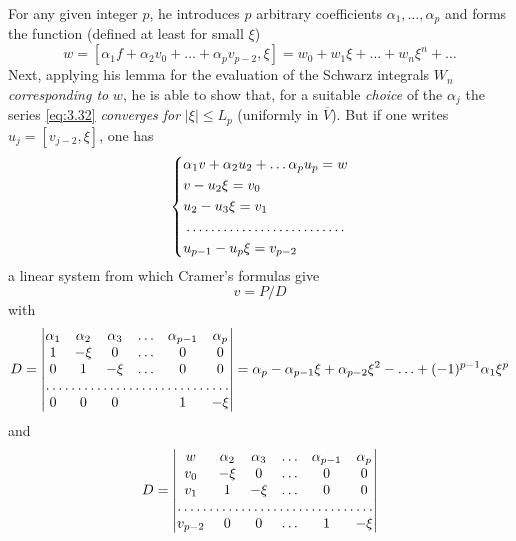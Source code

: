 \documentclass[12pt,a4paper,leqno,twoside]{extbook}
\begin{document}
For any given integer \(p\), he introduces \(p\) arbitrary coefficients \(\alpha_1, \ldots, \alpha_p\) and forms the function (defined at least for small \(\xi\))
\begin{equation}
    \label{eq:3.32}
    w = [\alpha_1 f + \alpha_2 v_0 + \ldots + \alpha_p v_{p-2}, \xi] = w_0 + w_1 \xi + \ldots + w_n \xi^n + \ldots
\end{equation}
Next, applying his lemma for the evaluation of the Schwarz integrals \(W_n\) \emph{corresponding to} \(w\), he is able to show that, for a suitable \emph{choice} of the \(\alpha_j\) the series \eqref{eq:3.32} \emph{converges for} \(|\xi| \leq L_p\) (uniformly in \(\overline{V}\)). But if one writes \(u_j = \left[v_{j-2}, \xi\right]\), one has
\begin{equation}
    \label{eq:3.33}
    \begin{dcases}
        \alpha_1 v + \alpha_2 u_2 + \ldots \alpha_p u_p = w \\
        v - u_2 \xi = v_0 \\
        u_2 - u_3 \xi = v_1 \\
        \dotfill \\
        u_{p-1} - u_p \xi = v_{p-2}
    \end{dcases}
\end{equation}
a linear system from which Cramer's formulas give
\begin{equation}
    \label{eq:3.34}
    v = P / D
\end{equation}
with
\[
    D =
    \left|
    \begin{matrix}
        \alpha_1 & \alpha_2 & \alpha_3 & \ldots & \alpha_{p-1} & \alpha_p \\
        1 & -\xi & 0 & \ldots & 0 & 0 \\
        0 & 1 & -\xi & \ldots & 0 & 0 \\
        \hdotsfor{6} \\
        0 & 0 & 0 & & 1 & -\xi
    \end{matrix}
    \right|
    = \alpha_p - \alpha_{p-1}\xi + \alpha_{p-2}\xi^2 - \ldots + (-1)^{p-1} \alpha_1 \xi^p
\]
and
\[
    D =
    \left|
    \begin{matrix}
        w & \alpha_2 & \alpha_3 & \ldots & \alpha_{p-1} & \alpha_p \\
        v_0 & -\xi & 0 & \ldots & 0 & 0 \\
        v_1 & 1 & -\xi & \ldots & 0 & 0 \\
        \hdotsfor{6} \\
        v_{p-2} & 0 & 0 & \ldots & 1 & -\xi
    \end{matrix}
    \right|
\]
\end{document}

